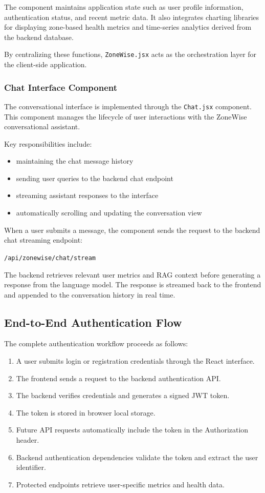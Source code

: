 \documentclass[11pt,twocolumn]{article}
\begin{document}
The component maintains application state such as user profile information, authentication status, and recent metric data. It also integrates charting libraries for displaying zone-based health metrics and time-series analytics derived from the backend database.

By centralizing these functions, \texttt{ZoneWise.jsx} acts as the orchestration layer for the client-side application.

\subsubsection{Chat Interface Component}

The conversational interface is implemented through the \texttt{Chat.jsx} component. This component manages the lifecycle of user interactions with the ZoneWise conversational assistant.

Key responsibilities include:

\begin{itemize}
\item maintaining the chat message history
\item sending user queries to the backend chat endpoint
\item streaming assistant responses to the interface
\item automatically scrolling and updating the conversation view
\end{itemize}

When a user submits a message, the component sends the request to the backend chat streaming endpoint:

\texttt{/api/zonewise/chat/stream}


The backend retrieves relevant user metrics and RAG context before generating a response from the language model. The response is streamed back to the frontend and appended to the conversation history in real time.

\subsection{End-to-End Authentication Flow}

The complete authentication workflow proceeds as follows:

\begin{enumerate}
\item A user submits login or registration credentials through the React interface.
\item The frontend sends a request to the backend authentication API.
\item The backend verifies credentials and generates a signed JWT token.
\item The token is stored in browser local storage.
\item Future API requests automatically include the token in the Authorization header.
\item Backend authentication dependencies validate the token and extract the user identifier.
\item Protected endpoints retrieve user-specific metrics and health data.
\end{enumerate}
\end{document}
